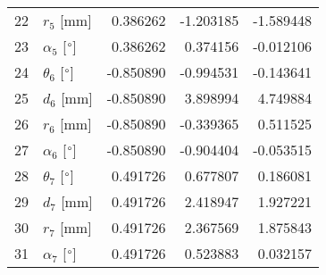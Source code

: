 \documentclass{standalone}%
\begin{document}
\begin{tabular}{llrrr}
22 &              $r_{5}$ [mm] &  0.386262 &  -1.203185 &  -1.589448 \\
23 &  $\alpha_{5}$ [$\degree$] &  0.386262 &   0.374156 &  -0.012106 \\
24 &  $\theta_{6}$ [$\degree$] & -0.850890 &  -0.994531 &  -0.143641 \\
25 &              $d_{6}$ [mm] & -0.850890 &   3.898994 &   4.749884 \\
26 &              $r_{6}$ [mm] & -0.850890 &  -0.339365 &   0.511525 \\
27 &  $\alpha_{6}$ [$\degree$] & -0.850890 &  -0.904404 &  -0.053515 \\
28 &  $\theta_{7}$ [$\degree$] &  0.491726 &   0.677807 &   0.186081 \\
29 &              $d_{7}$ [mm] &  0.491726 &   2.418947 &   1.927221 \\
30 &              $r_{7}$ [mm] &  0.491726 &   2.367569 &   1.875843 \\
31 &  $\alpha_{7}$ [$\degree$] &  0.491726 &   0.523883 &   0.032157 \\
\bottomrule
\end{tabular}
%
\end{document}

